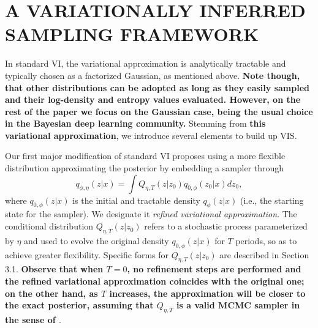 \section{A VARIATIONALLY INFERRED SAMPLING FRAMEWORK}\label{sec:main}


In standard VI, the variational approximation %
is analytically tractable and typically chosen as a factorized Gaussian, as mentioned above. {\bf Note though, that 
other distributions can be adopted as long as they 
easily sampled and their log-density and entropy values
evaluated. However, on the rest of the paper we focus on the Gaussian case, being the usual choice in the Bayesian deep learning community.}
Stemming from {\bf this variational approximation}, we introduce several elements to build up VIS.

Our first major modification of standard VI proposes using a more
flexible distribution approximating the posterior by embedding a sampler through
\begin{equation}\label{eq:q}
q_{\phi,\eta}(z|x) = \int Q_{\eta, T}(z|z_0)q_{0,\phi}(z_0|x)dz_0,
\end{equation}
where $q_{0,\phi} (z | x)$ is the initial and tractable density
$q_{\phi} (z | x)$
(i.e., the starting state for the sampler). %
We designate it {\em refined variational approximation}.
The conditional distribution $Q_{\eta, T}(z|z_0)$ refers
to a stochastic process parameterized by $\eta$ and 
used to evolve the original density $q_{0,\phi}(z|x)$
for $T$ periods, so as to achieve greater flexibility. Specific 
forms for $Q_{\eta, T}(z|z_0)$
are described in Section 3.1.
{\bf Observe that when $T=0$, no refinement steps are performed and the refined variational approximation coincides with the original one; on the other hand, as 
 $T$ increases, the approximation will be closer to the exact posterior, assuming that $Q_{\eta, T}$ is a valid MCMC sampler
 in the sense of \cite{ma2015complete}}.

